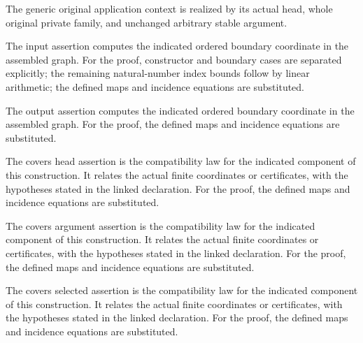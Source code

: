 The generic original application context is realized by its actual head, whole original private family, and unchanged arbitrary stable argument.
\par{}

The input assertion computes the indicated ordered boundary coordinate in the assembled graph.
For the proof, constructor and boundary cases are separated explicitly; the remaining natural-number index bounds follow by linear arithmetic; the defined maps and incidence equations are substituted.
\par{}

The output assertion computes the indicated ordered boundary coordinate in the assembled graph.
For the proof, the defined maps and incidence equations are substituted.
\par{}

The covers head assertion is the compatibility law for the indicated component of this construction. It relates the actual finite coordinates or certificates, with the hypotheses stated in the linked declaration.
For the proof, the defined maps and incidence equations are substituted.
\par{}

The covers argument assertion is the compatibility law for the indicated component of this construction. It relates the actual finite coordinates or certificates, with the hypotheses stated in the linked declaration.
For the proof, the defined maps and incidence equations are substituted.
\par{}

The covers selected assertion is the compatibility law for the indicated component of this construction. It relates the actual finite coordinates or certificates, with the hypotheses stated in the linked declaration.
For the proof, the defined maps and incidence equations are substituted.
\par{}

